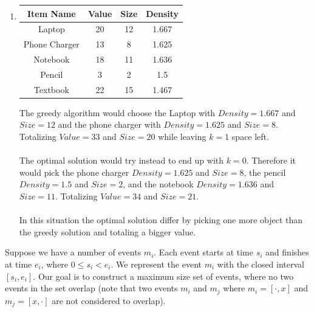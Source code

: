 \documentclass[9pt]{article}
\begin{document}
\begin{enumerate}
    \item \phantom{.}
    \begin{center}
    \begin{tabular}{c|c|c|c}
    Item Name & Value & Size & Density\\ \hline
    Laptop & 20 & 12 & 1.667\\ 
    Phone Charger & 13 & 8 & 1.625 \\
    Notebook & 18 & 11 & 1.636\\
    Pencil & 3 & 2 & 1.5 \\
    Textbook & 22 & 15 & 1.467
    \end{tabular}
    \end{center}
        The greedy algorithm would choose the Laptop with $Density = 1.667$ and $Size = 12$ and the phone charger with $Density = 1.625$ and $Size = 8$. Totalizing $Value = 33$ and $Size = 20$ while leaving $k=1$ space left.\\\\
        The optimal solution would try instead to end up with $k=0$. Therefore it would pick the phone charger $Density = 1.625$ and $Size = 8$, the pencil $Density = 1.5$ and $Size = 2$, and the notebook $Density = 1.636$ and $Size = 11$. Totalizing $Value = 34$ and $Size = 21$.\\\\
        In this situation the optimal solution differ by picking one more object than the greedy solution and totaling a bigger value. 
    \end{enumerate}

\newpage



\vspace{5mm}

\item Suppose we have a number of events $m_{i}$. Each event starts at time $s_{i}$ and finishes at time $e_{i}$, where $0 \leq s_{i} < e_{i}$. We represent the event $m_{i}$ with the closed interval $[s_{i}, e_{i}].$ Our goal is to construct a maximum size set of events, where no two events in the set overlap (note that two events $m_{i}$ and $m_{j}$ where $m_{i} = [\cdot, x]$ and $m_{j} = [x, \cdot]$ are not considered to overlap). \\
\end{document}
